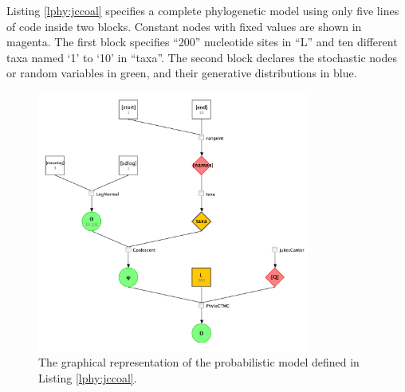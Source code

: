 \documentclass[10pt,letterpaper,table]{article}
\begin{document}
\medskip{}

Listing \ref{lphy:jccoal} specifies a complete phylogenetic model using only five lines of code inside two blocks. Constant nodes with fixed values are shown in magenta.  
The first block specifies ``200'' nucleotide sites in ``L'' and ten different taxa named `1' to `10' in ``taxa''. 
The second block declares the stochastic nodes or random variables in green, and their generative distributions in blue.


\begin{figure}
   \includegraphics[width=0.8\textwidth]{figs_plos/jc_coal.png}
  \caption{The graphical representation of the probabilistic model defined in Listing \ref{lphy:jccoal}.} 
  \label{fig:jccoalPGM}
\end{figure}

\end{document}
